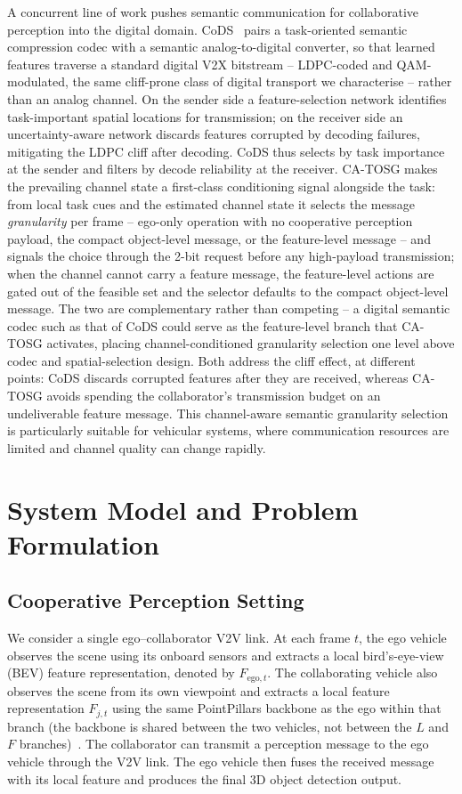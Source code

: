 \documentclass[journal]{IEEEtran}
\newcommand{\method}{CA-TOSG}
\begin{document}
A concurrent line of work pushes semantic communication for collaborative perception into the digital domain. CoDS~\cite{gan2025cods} pairs a task-oriented semantic compression codec with a semantic analog-to-digital converter, so that learned features traverse a standard digital V2X bitstream -- LDPC-coded and QAM-modulated, the same cliff-prone class of digital transport we characterise -- rather than an analog channel. On the sender side a feature-selection network identifies task-important spatial locations for transmission; on the receiver side an uncertainty-aware network discards features corrupted by decoding failures, mitigating the LDPC cliff after decoding. CoDS thus selects by task importance at the sender and filters by decode reliability at the receiver. \method{} makes the prevailing channel state a first-class conditioning signal alongside the task: from local task cues and the estimated channel state it selects the message \emph{granularity} per frame -- ego-only operation with no cooperative perception payload, the compact object-level message, or the feature-level message -- and signals the choice through the 2-bit request before any high-payload transmission; when the channel cannot carry a feature message, the feature-level actions are gated out of the feasible set and the selector defaults to the compact object-level message. The two are complementary rather than competing -- a digital semantic codec such as that of CoDS could serve as the feature-level branch that \method{} activates, placing channel-conditioned granularity selection one level above codec and spatial-selection design. Both address the cliff effect, at different points: CoDS discards corrupted features after they are received, whereas \method{} avoids spending the collaborator's transmission budget on an undeliverable feature message. This channel-aware semantic granularity selection is particularly suitable for vehicular systems, where communication resources are limited and channel quality can change rapidly.

\section{System Model and Problem Formulation}\label{sec:system}

\subsection{Cooperative Perception Setting}

We consider a single ego--collaborator V2V link. At each frame $t$, the ego vehicle observes the scene using its onboard sensors and extracts a local bird's-eye-view (BEV) feature representation, denoted by $F_{\mathrm{ego},t}$. The collaborating vehicle also observes the scene from its own viewpoint and extracts a local feature representation $F_{j,t}$ using the same PointPillars backbone as the ego within that branch (the backbone is shared between the two vehicles, not between the $L$ and $F$ branches)~\cite{lang2019pointpillars}. The collaborator can transmit a perception message to the ego vehicle through the V2V link. The ego vehicle then fuses the received message with its local feature and produces the final 3D object detection output.
\end{document}
